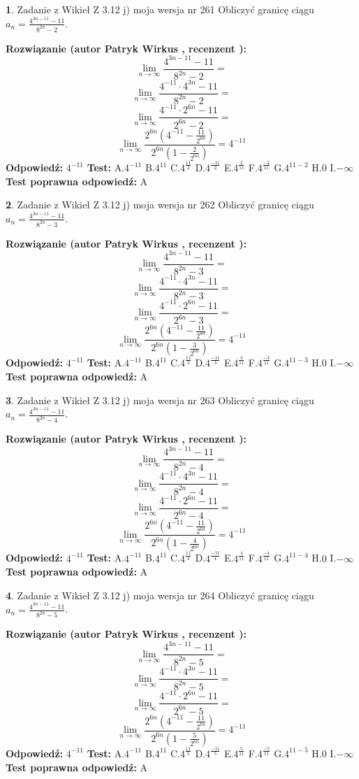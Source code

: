 \documentclass[12pt, a4paper]{article}
\theoremstyle{definition} %
\newtheorem{zad}{}
\newcommand{\zadStart}[1]{\begin{zad}#1\newline}
\newcommand{\zadStop}{\end{zad}}
\newcommand{\rozwStart}[2]{\noindent \textbf{Rozwiązanie (autor #1 , recenzent #2): }\newline}
\newcommand{\rozwStop}{\newline}
\newcommand{\odpStart}{\noindent \textbf{Odpowiedź:}\newline}
\newcommand{\odpStop}{\newline}
\newcommand{\testStart}{\noindent \textbf{Test:}\newline}
\newcommand{\testStop}{\newline}
\newcommand{\kluczStart}{\noindent \textbf{Test poprawna odpowiedź:}\newline}
\newcommand{\kluczStop}{\newline}
\begin{document}
\zadStart{Zadanie z Wikieł Z 3.12 j) moja wersja nr 261}
Obliczyć granicę ciągu $a_{n}=\frac{4^{3n-11}-11}{8^{2n}-2}$.
\zadStop
\rozwStart{Patryk Wirkus}{}
$$\lim\limits_{n\to\infty}\frac{4^{3n-11}-11}{8^{2n}-2}=$$
$$\lim\limits_{n\to\infty}\frac{4^{-11} \cdot 4^{3n}-11}{8^{2n}-2}=$$
$$\lim\limits_{n\to\infty}\frac{4^{-11} \cdot 2^{6n}-11}{2^{6n}-2}=$$
$$\lim\limits_{n\to\infty}\frac{2^{6n}(4^{-11} - \frac{11}{2^{6n}})}{2^{6n}(1-\frac{2}{2^{6n}})}= 4^{-11}$$
\rozwStop
\odpStart
$4^{-11}$
\odpStop
\testStart
A.$4^{-11}$
B.$4^{11}$
C.$4^{\frac{11}{2}}$
D.$4^{\frac{-11}{2}}$
E.$4^{\frac{2}{11}}$
F.$4^{\frac{-2}{11}}$
G.$4^{11-2}$
H.$0$
I.$-\infty$
\testStop
\kluczStart
A
\kluczStop



\zadStart{Zadanie z Wikieł Z 3.12 j) moja wersja nr 262}
Obliczyć granicę ciągu $a_{n}=\frac{4^{3n-11}-11}{8^{2n}-3}$.
\zadStop
\rozwStart{Patryk Wirkus}{}
$$\lim\limits_{n\to\infty}\frac{4^{3n-11}-11}{8^{2n}-3}=$$
$$\lim\limits_{n\to\infty}\frac{4^{-11} \cdot 4^{3n}-11}{8^{2n}-3}=$$
$$\lim\limits_{n\to\infty}\frac{4^{-11} \cdot 2^{6n}-11}{2^{6n}-3}=$$
$$\lim\limits_{n\to\infty}\frac{2^{6n}(4^{-11} - \frac{11}{2^{6n}})}{2^{6n}(1-\frac{3}{2^{6n}})}= 4^{-11}$$
\rozwStop
\odpStart
$4^{-11}$
\odpStop
\testStart
A.$4^{-11}$
B.$4^{11}$
C.$4^{\frac{11}{3}}$
D.$4^{\frac{-11}{3}}$
E.$4^{\frac{3}{11}}$
F.$4^{\frac{-3}{11}}$
G.$4^{11-3}$
H.$0$
I.$-\infty$
\testStop
\kluczStart
A
\kluczStop



\zadStart{Zadanie z Wikieł Z 3.12 j) moja wersja nr 263}
Obliczyć granicę ciągu $a_{n}=\frac{4^{3n-11}-11}{8^{2n}-4}$.
\zadStop
\rozwStart{Patryk Wirkus}{}
$$\lim\limits_{n\to\infty}\frac{4^{3n-11}-11}{8^{2n}-4}=$$
$$\lim\limits_{n\to\infty}\frac{4^{-11} \cdot 4^{3n}-11}{8^{2n}-4}=$$
$$\lim\limits_{n\to\infty}\frac{4^{-11} \cdot 2^{6n}-11}{2^{6n}-4}=$$
$$\lim\limits_{n\to\infty}\frac{2^{6n}(4^{-11} - \frac{11}{2^{6n}})}{2^{6n}(1-\frac{4}{2^{6n}})}= 4^{-11}$$
\rozwStop
\odpStart
$4^{-11}$
\odpStop
\testStart
A.$4^{-11}$
B.$4^{11}$
C.$4^{\frac{11}{4}}$
D.$4^{\frac{-11}{4}}$
E.$4^{\frac{4}{11}}$
F.$4^{\frac{-4}{11}}$
G.$4^{11-4}$
H.$0$
I.$-\infty$
\testStop
\kluczStart
A
\kluczStop



\zadStart{Zadanie z Wikieł Z 3.12 j) moja wersja nr 264}
Obliczyć granicę ciągu $a_{n}=\frac{4^{3n-11}-11}{8^{2n}-5}$.
\zadStop
\rozwStart{Patryk Wirkus}{}
$$\lim\limits_{n\to\infty}\frac{4^{3n-11}-11}{8^{2n}-5}=$$
$$\lim\limits_{n\to\infty}\frac{4^{-11} \cdot 4^{3n}-11}{8^{2n}-5}=$$
$$\lim\limits_{n\to\infty}\frac{4^{-11} \cdot 2^{6n}-11}{2^{6n}-5}=$$
$$\lim\limits_{n\to\infty}\frac{2^{6n}(4^{-11} - \frac{11}{2^{6n}})}{2^{6n}(1-\frac{5}{2^{6n}})}= 4^{-11}$$
\rozwStop
\odpStart
$4^{-11}$
\odpStop
\testStart
A.$4^{-11}$
B.$4^{11}$
C.$4^{\frac{11}{5}}$
D.$4^{\frac{-11}{5}}$
E.$4^{\frac{5}{11}}$
F.$4^{\frac{-5}{11}}$
G.$4^{11-5}$
H.$0$
I.$-\infty$
\testStop
\kluczStart
A
\kluczStop
\end{document}
